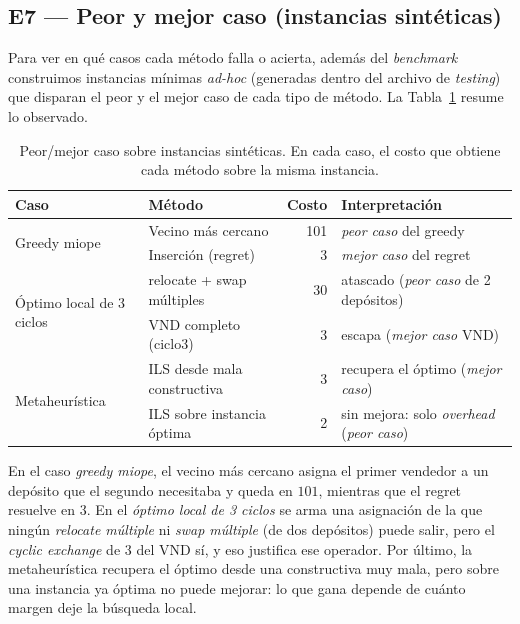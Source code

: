 \documentclass[11pt,a4paper]{article}
\begin{document}
\subsection{E7 --- Peor y mejor caso (instancias sintéticas)}
Para ver en qué casos cada método falla o acierta, además del \emph{benchmark} construimos
instancias mínimas \emph{ad-hoc} (generadas dentro del archivo de \emph{testing}) que disparan
el peor y el mejor caso de cada tipo de método. La Tabla~\ref{tab:sinteticas} resume lo
observado.

\begin{table}[ht]
\centering
\caption{Peor/mejor caso sobre instancias sintéticas. En cada caso, el costo que obtiene
cada método sobre la misma instancia.}
\label{tab:sinteticas}
\small
\begin{tabular}{@{}l l r l@{}}
\toprule
Caso & Método & Costo & Interpretación \\
\midrule
\multirow{2}{*}{Greedy miope}
  & Vecino más cercano & 101 & \emph{peor caso} del greedy \\
  & Inserción (regret) & 3   & \emph{mejor caso} del regret \\
\midrule
\multirow{2}{*}{Óptimo local de 3 ciclos}
  & relocate + swap múltiples & 30 & atascado (\emph{peor caso} de 2 depósitos) \\
  & VND completo (ciclo3) & 3 & escapa (\emph{mejor caso} VND) \\
\midrule
\multirow{2}{*}{Metaheurística}
  & ILS desde mala constructiva & 3 & recupera el óptimo (\emph{mejor caso}) \\
  & ILS sobre instancia óptima & 2 & sin mejora: solo \emph{overhead} (\emph{peor caso}) \\
\bottomrule
\end{tabular}
\end{table}

En el caso \emph{greedy miope}, el vecino más cercano asigna el primer vendedor a un depósito
que el segundo necesitaba y queda en $101$, mientras que el regret resuelve en $3$. En el
\emph{óptimo local de 3 ciclos} se arma una asignación de la que ningún \emph{relocate múltiple}
ni \emph{swap múltiple} (de dos depósitos) puede salir, pero el \emph{cyclic exchange} de $3$ del
VND sí, y
eso justifica ese operador. Por último, la metaheurística recupera el óptimo desde una
constructiva muy mala, pero sobre una instancia ya óptima no puede mejorar: lo que gana depende
de cuánto margen deje la búsqueda local.

\end{document}
